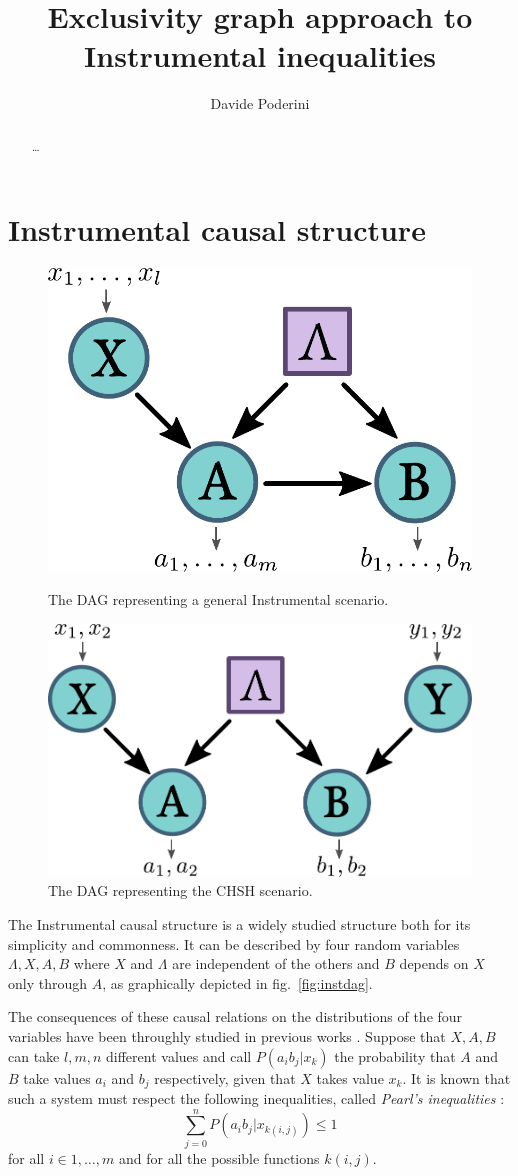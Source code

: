 \documentclass[floatfix, twocolumn, aps, prl]{revtex4-1}
\begin{document}
\title{Exclusivity graph approach to Instrumental inequalities}
\author{Davide Poderini}
\begin{abstract}
    \ldots
\end{abstract}

\maketitle

\section*{Instrumental causal structure}
\begin{figure}[h]
    \centering
    \parbox{.4\columnwidth}{
        \includegraphics[width=.4\columnwidth]{images/instdag.pdf}
        \caption{The DAG representing a general Instrumental scenario.}
        \label{fig:instdag}
    }
    \qquad
    \parbox{.4\columnwidth}{
        \includegraphics[width=.4\columnwidth]{images/chshdag.pdf}
        \caption{The DAG representing the CHSH scenario.}
        \label{fig:chshdag}
    }
\end{figure}

The Instrumental causal structure is a widely studied
structure both for its simplicity and commonness.
It can be described by four random variables $\Lambda, X, A, B$ where $X$ and
$\Lambda$ are independent of the others and $B$ depends on $X$ only through $A$,
as graphically depicted in fig.~\ref{fig:instdag}.

The consequences of these causal relations on the distributions of the four
variables have been throughly studied in previous works \cite{pearl1995,
bonet2001}.
Suppose that $X, A, B$ can take $l,m,n$ different values and 
call $P(a_i b_j | x_k)$ the probability that $A$ and $B$ take values $a_i$
and $b_j$ respectively, given that $X$ takes value $x_k$.
It is known that such a system must respect the following inequalities,
called \emph{Pearl's inequalities} \cite{pearl1995}:
\begin{equation}
    \sum_{j=0}^{n} P(a_i b_j|x_{k(i,j)}) \le 1
    \label{eq:pearl_ineq}
\end{equation}
for all $i \in {1,\ldots, m}$ and for all the possible functions $k(i,j)$.
\end{document}
